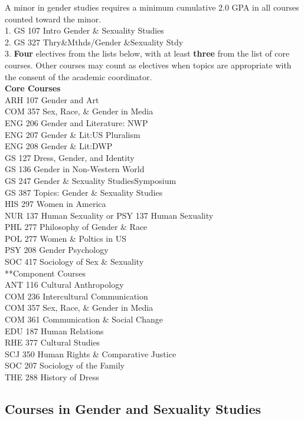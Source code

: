 \documentclass[
  letterpaper,
]{scrbook}
\begin{document}
A minor in gender studies requires a minimum cumulative 2.0 GPA in all
courses counted toward the minor.\\
1. GS 107 Intro Gender \& Sexuality Studies\\
2. GS 327 Thry\&Mthds/Gender \&Sexuality Stdy\\
3. \textbf{Four} electives from the lists below, with at least
\textbf{three} from the list of core courses. Other courses may count as
electives when topics are appropriate with the consent of the academic
coordinator.\\
\textbf{Core Courses}\\
ARH 107 Gender and Art\\
COM 357 Sex, Race, \& Gender in Media\\
ENG 206 Gender and Literature: NWP\\
ENG 207 Gender \& Lit:US Pluralism\\
ENG 208 Gender \& Lit:DWP\\
GS 127 Dress, Gender, and Identity\\
GS 136 Gender in Non-Western World\\
GS 247 Gender \& Sexuality StudiesSymposium\\
GS 387 Topics: Gender \& Sexuality Studies\\
HIS 297 Women in America\\
NUR 137 Human Sexuality or PSY 137 Human Sexuality\\
PHL 277 Philosophy of Gender \& Race\\
POL 277 Women \& Poltics in US\\
PSY 208 Gender Psychology\\
SOC 417 Sociology of Sex \& Sexuality\\
**Component Courses\\
ANT 116 Cultural Anthropology\\
COM 236 Intercultural Communication\\
COM 357 Sex, Race, \& Gender in Media\\
COM 361 Communication \& Social Change\\
EDU 187 Human Relations\\
RHE 377 Cultural Studies\\
SCJ 350 Human Rights \& Comparative Justice\\
SOC 207 Sociology of the Family\\
THE 288 History of Dress

\subsection{Courses in Gender and Sexuality
Studies}\label{courses-in-gender-and-sexuality-studies}
\end{document}
